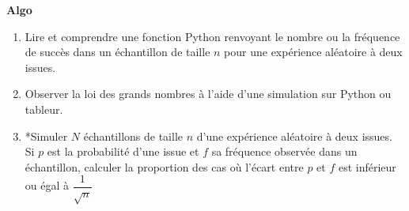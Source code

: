 \documentclass[10pt,a4paper]{article}
\begin{document}
\textbf{Algo}

 
\begin{enumerate} 
\item Lire et comprendre une fonction Python renvoyant le nombre ou la fréquence de succès dans un échantillon de taille $n$ pour une expérience aléatoire à deux issues.
\item Observer la loi des grands nombres à l'aide d'une simulation sur Python ou tableur.
\item *Simuler $N$ échantillons de taille $n$ d'une expérience aléatoire à deux issues. Si $p$ est la probabilité d’une issue et $f$ sa fréquence observée dans un échantillon, calculer la proportion des cas où l'écart entre $p$ et $f$ est inférieur ou égal à $\dfrac{1}{\sqrt n}$
\end{enumerate}
\end{document}
